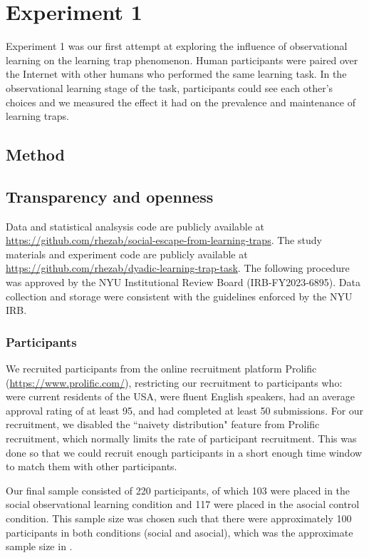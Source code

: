 \documentclass[11pt]{article} %
\begin{document}
\section{Experiment 1}

Experiment 1 was our first attempt at exploring the influence of observational learning on the learning trap phenomenon.  Human participants were paired over the Internet with other humans who performed the same learning task.  In the observational learning stage of the task, participants could see each other's choices and we measured the effect it had on the prevalence and maintenance of learning traps.

\subsection{Method}

\subsection{Transparency and openness}
Data and statistical analsysis code are publicly available at \url{https://github.com/rhezab/social-escape-from-learning-traps}. The study materials and experiment code are publicly available at \url{https://github.com/rhezab/dyadic-learning-trap-task}. The following procedure was approved by the NYU Institutional Review Board (IRB-FY2023-6895). Data collection and storage were consistent with the guidelines enforced by the NYU IRB. 

\subsubsection{Participants} 

We recruited participants from the online recruitment platform Prolific (\url{https://www.prolific.com/}), restricting our recruitment to participants who: were current residents of the USA, were fluent English speakers, had an average approval rating of at least 95, and had completed at least 50 submissions. For our recruitment, we disabled the ``naivety distribution" feature from Prolific recruitment, which normally limits the rate of participant recruitment. This was done so that we could recruit enough participants in a short enough time window to match them with other participants. 

Our final sample consisted of 220 participants, of which 103 were placed in the social observational learning condition and 117 were placed in the asocial control condition. This sample size was chosen such that there were approximately 100 participants in both conditions (social and asocial), which was the approximate sample size in \citeauthor{richLimitsLearningExploration2018} \citeyear{richLimitsLearningExploration2018}. 
\end{document}
